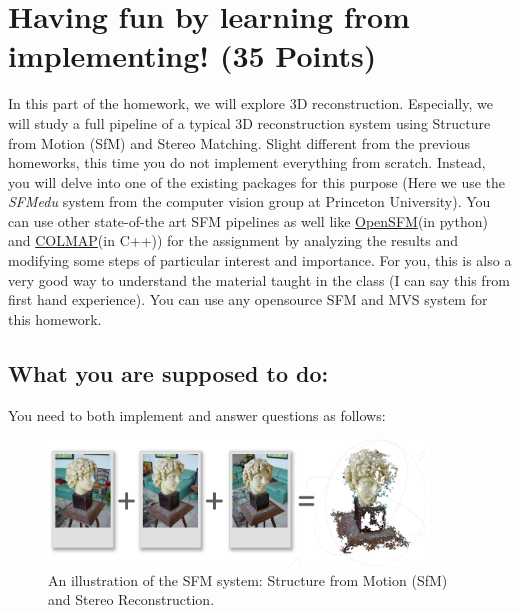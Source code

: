 \documentclass[11pt]{article}
\begin{document}
\section{Having fun by learning from implementing! (35 Points)}
In this part of the homework, we will explore 3D reconstruction. Especially, we will study a full pipeline of a typical 3D reconstruction system using Structure from Motion (SfM) and Stereo Matching. Slight different from the previous homeworks, this time you do not implement everything from scratch. Instead, you will delve into one of the existing packages for this purpose (Here we use the {\em SFMedu} system from the computer vision group at Princeton University). You can use other state-of-the art SFM pipelines as well like \href{https://github.com/mapillary/OpenSfM}{OpenSFM}(in python) and \href{https://colmap.github.io/}{COLMAP}(in C++)) for the assignment by analyzing the results and modifying some steps of particular interest and importance. For you, this is also a very good way to understand the material taught in the class (I can say this from first hand experience). You can use any opensource SFM and MVS system for this homework. 

\subsection{What you are supposed to do:}
You need to both implement and answer questions as follows:

\begin{figure}[h!]
\centering
\includegraphics[width=0.9\textwidth]{tmpimages/teaser.jpg}
\caption{An illustration of the SFM system: Structure from Motion (SfM) and Stereo Reconstruction.}
\label{fig:sfmedu}
\end{figure}
\end{document}
